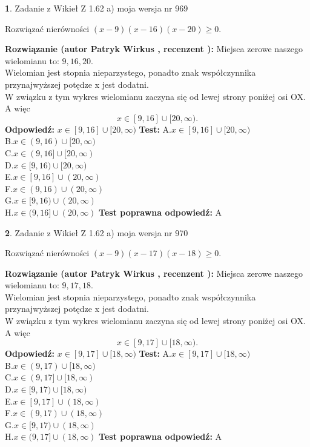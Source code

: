 \documentclass[12pt, a4paper]{article}
\theoremstyle{definition} %
\newtheorem{zad}{}
\newcommand{\zadStart}[1]{\begin{zad}#1\newline}
\newcommand{\zadStop}{\end{zad}}
\newcommand{\rozwStart}[2]{\noindent \textbf{Rozwiązanie (autor #1 , recenzent #2): }\newline}
\newcommand{\rozwStop}{\newline}
\newcommand{\odpStart}{\noindent \textbf{Odpowiedź:}\newline}
\newcommand{\odpStop}{\newline}
\newcommand{\testStart}{\noindent \textbf{Test:}\newline}
\newcommand{\testStop}{\newline}
\newcommand{\kluczStart}{\noindent \textbf{Test poprawna odpowiedź:}\newline}
\newcommand{\kluczStop}{\newline}
\begin{document}
\zadStart{Zadanie z Wikieł Z 1.62 a) moja wersja nr 969}

Rozwiązać nierówności $(x-9)(x-16)(x-20)\ge0$.
\zadStop
\rozwStart{Patryk Wirkus}{}
Miejsca zerowe naszego wielomianu to: $9, 16, 20$.\\
Wielomian jest stopnia nieparzystego, ponadto znak współczynnika przy\linebreak najwyższej potędze x jest dodatni.\\ W związku z tym wykres wielomianu zaczyna się od lewej strony poniżej osi OX. A więc $$x \in [9,16] \cup [20,\infty).$$
\rozwStop
\odpStart
$x \in [9,16] \cup [20,\infty)$
\odpStop
\testStart
A.$x \in [9,16] \cup [20,\infty)$\\
B.$x \in (9,16) \cup [20,\infty)$\\
C.$x \in (9,16] \cup [20,\infty)$\\
D.$x \in [9,16) \cup [20,\infty)$\\
E.$x \in [9,16] \cup (20,\infty)$\\
F.$x \in (9,16) \cup (20,\infty)$\\
G.$x \in [9,16) \cup (20,\infty)$\\
H.$x \in (9,16] \cup (20,\infty)$
\testStop
\kluczStart
A
\kluczStop



\zadStart{Zadanie z Wikieł Z 1.62 a) moja wersja nr 970}

Rozwiązać nierówności $(x-9)(x-17)(x-18)\ge0$.
\zadStop
\rozwStart{Patryk Wirkus}{}
Miejsca zerowe naszego wielomianu to: $9, 17, 18$.\\
Wielomian jest stopnia nieparzystego, ponadto znak współczynnika przy\linebreak najwyższej potędze x jest dodatni.\\ W związku z tym wykres wielomianu zaczyna się od lewej strony poniżej osi OX. A więc $$x \in [9,17] \cup [18,\infty).$$
\rozwStop
\odpStart
$x \in [9,17] \cup [18,\infty)$
\odpStop
\testStart
A.$x \in [9,17] \cup [18,\infty)$\\
B.$x \in (9,17) \cup [18,\infty)$\\
C.$x \in (9,17] \cup [18,\infty)$\\
D.$x \in [9,17) \cup [18,\infty)$\\
E.$x \in [9,17] \cup (18,\infty)$\\
F.$x \in (9,17) \cup (18,\infty)$\\
G.$x \in [9,17) \cup (18,\infty)$\\
H.$x \in (9,17] \cup (18,\infty)$
\testStop
\kluczStart
A
\kluczStop
\end{document}
